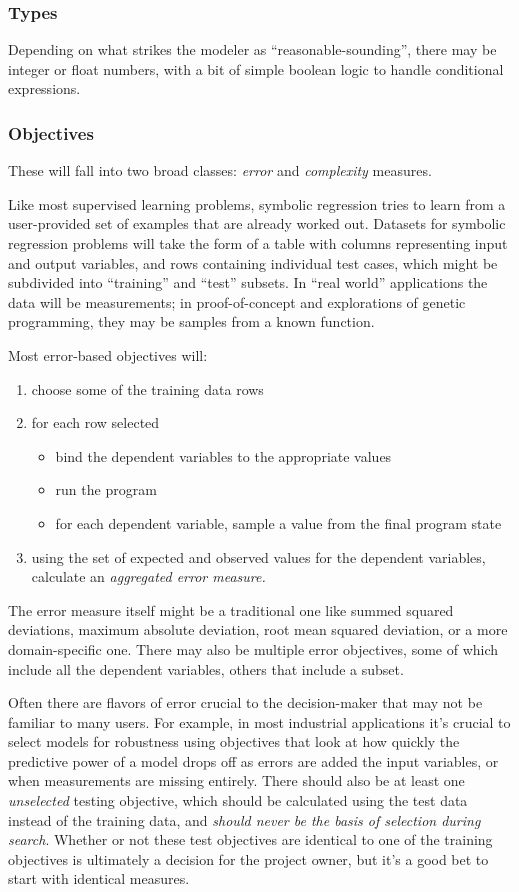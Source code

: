 \documentclass[12pt]{article}
\begin{document}
\subsubsection{Types}
Depending on what strikes the modeler as ``reasonable-sounding'', there may be integer or float numbers, with a bit of simple boolean logic to handle conditional expressions.

\subsubsection{Objectives}

These will fall into two broad classes: \emph{error} and \emph{complexity} measures.

Like most supervised learning problems, symbolic regression tries to learn from a user-provided set of examples that are already worked out. Datasets for symbolic regression problems will take the form of a table with columns representing input and output variables, and rows containing individual test cases, which might be subdivided into ``training'' and ``test'' subsets. In ``real world'' applications the data will be measurements; in proof-of-concept and explorations of genetic programming, they may be samples from a known function.

Most error-based objectives will: \begin{enumerate} \item{choose some of the training data rows} \item{for each row selected}\begin{itemize} \item{bind the dependent variables to the appropriate values} \item{run the program} \item{for each dependent variable, sample a value from the final program state} \end{itemize} \item{using the set of expected and observed values for the dependent variables, calculate an \emph{aggregated error measure.}} \end{enumerate} The error measure itself might be a traditional one like summed squared deviations, maximum absolute deviation, root mean squared deviation, or a more domain-specific one. There may also be multiple error objectives, some of which include all the dependent variables, others that include a subset.

Often there are flavors of error crucial to the decision-maker that may not be familiar to many users. For example, in most industrial applications it's crucial to select models for robustness using objectives that look at how quickly the predictive power of a model drops off as errors are added the input variables, or when measurements are missing entirely. There should also be at least one \emph{unselected} testing objective, which should be calculated using the test data instead of the training data, and \emph{should never be the basis of selection during search}. Whether or not these test objectives are identical to one of the training objectives is ultimately a decision for the project owner, but it's a good bet to start with identical measures.
\end{document}
